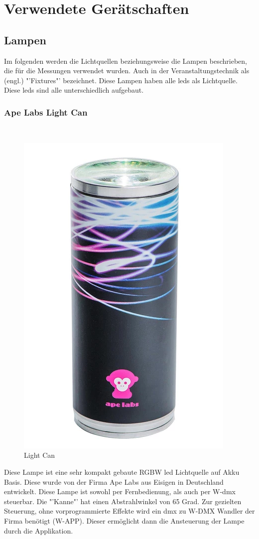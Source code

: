 \documentclass[11pt]{scrartcl}
\begin{document}
\section{Verwendete Gerätschaften}
\subsection{Lampen}
Im folgenden werden die Lichtquellen beziehungsweise die Lampen beschrieben, die für die Messungen verwendet wurden.
Auch in der Veranstaltungstechnik als (engl.) "'Fixtures"' bezeichnet. Diese Lampen haben alle \ac{led}s als Lichtquelle. Diese \ac{led}s
sind alle unterschiedlich aufgebaut.
\subsubsection{Ape Labs Light Can}
~\par\vspace{-\baselineskip}
\begin{figure}
    \vspace{-45pt}
    \begin{center}
        \includegraphics[width=.23\textwidth]{images/light_can_front.png}
    \end{center}
    \vspace{-20pt}
    \caption{Light Can}
    \vspace{-15pt}
\end{figure}
\noindent
Diese Lampe ist eine sehr kompakt gebaute RGBW \ac{led} Lichtquelle auf Akku Basis. Diese wurde von der Firma Ape Labs aus Eisigen in Deutschland
entwickelt. Diese Lampe ist sowohl per Fernbedienung, als auch per W-\ac{dmx} steuerbar.
Die "'Kanne"' hat einen Abstrahlwinkel von 65 Grad. Zur gezielten Steuerung, ohne vorprogrammierte Effekte wird ein \ac{dmx} zu W-DMX Wandler der
Firma benötigt (W-APP). Dieser ermöglicht dann die Ansteuerung der Lampe durch die Applikation.
\end{document}
